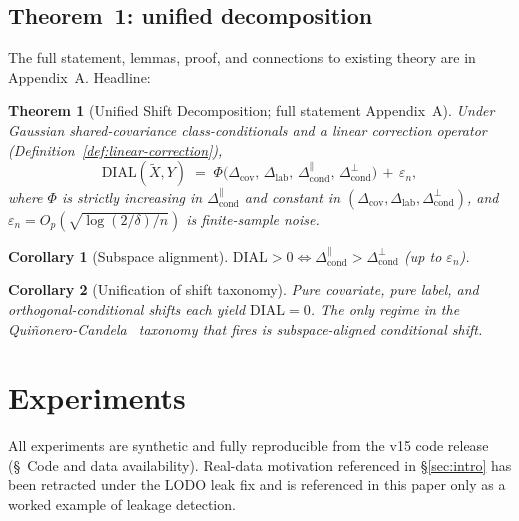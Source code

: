 \documentclass{article}
\newtheorem{theorem}{Theorem}
\newtheorem{corollary}{Corollary}
\newcommand{\dial}{\mathrm{DIAL}}
\begin{document}
\subsection{Theorem~1: unified decomposition}

The full statement, lemmas, proof, and connections to existing theory
are in Appendix~A. Headline:

\begin{theorem}[Unified Shift Decomposition; full statement Appendix~A]
\label{thm:unified}
Under Gaussian shared-covariance class-conditionals and a linear
correction operator (Definition~\ref{def:linear-correction}),
\[
   \dial(\tilde X,Y) \;=\; \Phi\!\bigl(\Delta_{\text{cov}},\,
     \Delta_{\text{lab}},\,
     \Delta_{\text{cond}}^{\parallel},\,
     \Delta_{\text{cond}}^{\perp}\bigr)\,+\,\varepsilon_n,
\]
where $\Phi$ is strictly increasing in $\Delta_{\text{cond}}^{\parallel}$
and constant in $(\Delta_{\text{cov}},\Delta_{\text{lab}},
\Delta_{\text{cond}}^{\perp})$, and
$\varepsilon_n=O_p(\sqrt{\log(2/\delta)/n})$ is finite-sample noise.
\end{theorem}

\begin{corollary}[Subspace alignment]
\label{cor:subspace}
$\dial>0\iff \Delta_{\text{cond}}^{\parallel}>\Delta_{\text{cond}}^{\perp}$
(up to $\varepsilon_n$).
\end{corollary}

\begin{corollary}[Unification of shift taxonomy]
\label{cor:taxonomy}
Pure covariate, pure label, and orthogonal-conditional shifts each
yield $\dial=0$. The only regime in the
Qui\~n{}onero-Candela~\citep{quionero2009dataset} taxonomy that fires
is \emph{subspace-aligned conditional shift}.
\end{corollary}

\section{Experiments}
\label{sec:exp}

All experiments are synthetic and fully reproducible from the v15 code
release (\S~Code and data availability). Real-data motivation referenced
in \S\ref{sec:intro} has been retracted under the LODO leak fix and is
referenced in this paper only as a worked example of leakage detection.
\end{document}
